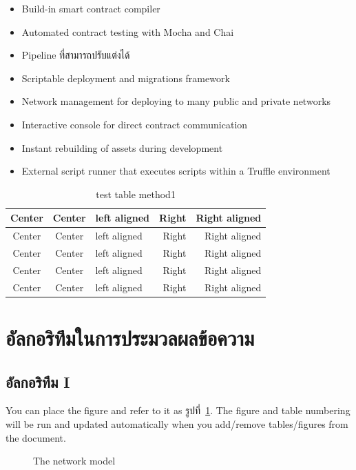 \documentclass[12pt,oneside,openright,a4paper]{cpe-thai-project}
\begin{document}
	\begin{itemize}[leftmargin=0pt,itemindent=2.5cm]
		\item Build-in smart contract compiler 
		\item Automated contract testing with Mocha and Chai 
		\item Pipeline ที่สามารถปรับแต่งได้ 
		\item Scriptable deployment and migrations framework 
		\item Network management for deploying to many public and private networks 
		\item Interactive console for direct contract communication 
		\item Instant rebuilding of assets during development 
		\item External script runner that executes scripts within a Truffle environment
	\end{itemize}

\begin{table}[!h]
\caption{test table method1}\label{tbl:method1}
\begin{tabular}{c|c|l|rr} \hline\hline
Center & Center & left aligned & Right & Right aligned \\ \hline\hline
Center & Center & left aligned & Right & Right aligned \\ \hline
Center & Center & left aligned & Right & Right aligned \\ 
Center & Center & left aligned & Right & Right aligned \\ \hline
Center & Center & left aligned & Right & Right aligned \\ \hline\hline
\end{tabular}
\end{table}


\section{อัลกอริทึมในการประมวลผลข้อความ}
\subsection{อัลกอริทึม I}

You can place the figure and refer to it as รูปที่~\ref{fig:model2}.
The figure and table numbering will be run and updated automatically when you add/remove tables/figures from the document.

\begin{figure}[!h]\centering
\setlength{\fboxrule}{0.2mm} %
\setlength{\fboxsep}{1cm}
\caption{The network model}\label{fig:model2}
\end{figure}
\end{document}
